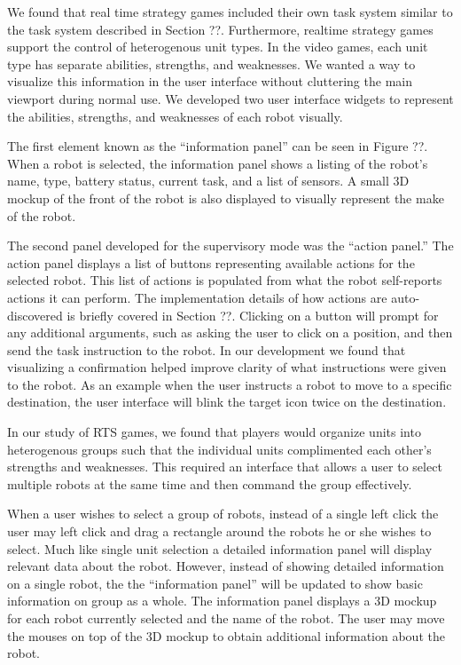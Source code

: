 We found that real time strategy games included their own task system similar to the task system described in Section ??. Furthermore, realtime strategy games support the control of heterogenous unit types. In the video games,  each unit type has separate abilities, strengths, and weaknesses. We wanted a way to visualize this information in the user interface without cluttering the main viewport during normal use. We developed two user interface widgets to represent the abilities, strengths, and weaknesses of each robot visually. 

The first element known as the ``information panel'' can be seen in Figure ??. When a robot is selected, the information panel shows a listing of the robot's name, type, battery status, current task, and a list of sensors. A small 3D mockup of the front of the robot is also displayed to visually represent the make of the robot.

The second panel developed for the supervisory mode was the ``action panel.'' The action panel displays a list of buttons representing available actions for the selected robot. This list of actions is populated from what the robot self-reports actions it can perform. The implementation details of how actions are auto-discovered is briefly covered in Section ??. Clicking on a button will prompt for any additional arguments, such as asking the user to click on a position, and then send the task instruction to the robot. In our development we found that visualizing a confirmation helped improve clarity of what instructions were given to the robot. As an example when the user instructs a robot to move to a specific destination, the user interface will blink the target icon twice on the destination.  

In our study of RTS games, we found that players would organize units into heterogenous groups such that the individual units complimented each other's strengths and weaknesses. This required an interface that allows a user to select multiple robots at the same time and then command the group effectively.

When a user wishes to select a group of robots, instead of a single left click the user may left click and drag a rectangle around the robots he or she wishes to select. Much like single unit selection a detailed information panel will display relevant data about the robot. However, instead of showing detailed information on a single robot, the the ``information panel'' will be updated to show basic information on group as a whole. The information panel displays a 3D mockup for each robot currently selected and the name of the robot. The user may move the mouses on top of the 3D mockup to obtain additional information about the robot.

